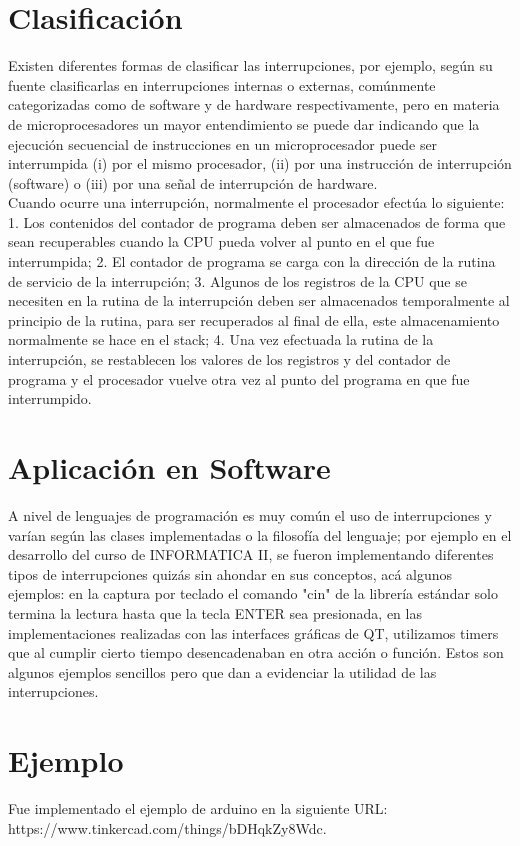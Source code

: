 \documentclass[]{article}
\begin{document}
\begin{multicols}{2}
		\section{Clasificación}
		Existen diferentes formas de clasificar las interrupciones, por ejemplo, según su fuente clasificarlas en interrupciones internas o externas, comúnmente categorizadas como de software y de hardware respectivamente\cite{mym}, pero en materia de microprocesadores un mayor entendimiento se puede dar indicando que la ejecución secuencial de instrucciones en un microprocesador puede ser interrumpida (i) por el mismo procesador, (ii) por una instrucción de interrupción (software) o (iii) por una señal de interrupción de hardware\cite{pcbased}.\\
		Cuando ocurre una interrupción, normalmente el procesador efectúa lo siguiente: 1. Los contenidos del contador de programa deben ser almacenados de forma que sean recuperables cuando la CPU pueda volver al punto en el que fue interrumpida; 2. El contador de programa se carga con la dirección de la rutina de servicio de la interrupción; 3. Algunos de los registros de la CPU que se necesiten en la rutina de la interrupción deben ser almacenados temporalmente al principio de la rutina, para ser recuperados al final de ella, este almacenamiento normalmente se hace en el stack; 4. Una vez efectuada la rutina de la interrupción, se restablecen los valores de los registros y del contador de programa y el procesador vuelve otra vez al punto del programa en que fue interrumpido\cite{edymicrop}.
		\section{Aplicación en Software}
		A nivel de lenguajes de programación es muy común el uso de interrupciones y varían según las clases implementadas o la filosofía del lenguaje; por ejemplo en el desarrollo del curso de INFORMATICA II, se fueron implementando diferentes tipos de interrupciones quizás sin ahondar en sus conceptos, acá algunos ejemplos: en la captura por teclado el comando "cin" de la librería estándar solo termina la lectura hasta que la tecla ENTER sea presionada, en las implementaciones realizadas con las interfaces gráficas de QT, utilizamos timers que al cumplir cierto tiempo desencadenaban en otra acción o función. Estos son algunos ejemplos sencillos pero que dan a evidenciar la utilidad de las interrupciones.
		\section{Ejemplo}
		Fue implementado el ejemplo de arduino en la siguiente URL: \\https://www.tinkercad.com/things/bDHqkZy8Wdc.
		\printbibliography
	\end{multicols}
	
\end{document}
